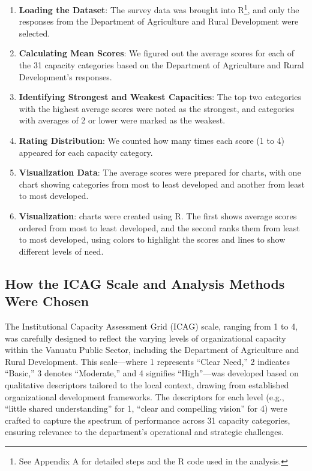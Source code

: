 \documentclass[
  10pt,
]{report}
\providecommand{\tightlist}{%
  \setlength{\itemsep}{0pt}\setlength{\parskip}{0pt}}
\begin{document}
\begin{enumerate}
\def\labelenumi{\arabic{enumi}.}
\tightlist
\item
  \textbf{Loading the Dataset}: The survey data was brought into
  R\footnote{See Appendix A for detailed steps and the R code used in
    the analysis.}, and only the responses from the Department of
  Agriculture and Rural Development were selected.
\item
  \textbf{Calculating Mean Scores}: We figured out the average scores
  for each of the 31 capacity categories based on the Department of
  Agriculture and Rural Development's responses.
\item
  \textbf{Identifying Strongest and Weakest Capacities}: The top two
  categories with the highest average scores were noted as the
  strongest, and categories with averages of 2 or lower were marked as
  the weakest.
\item
  \textbf{Rating Distribution}: We counted how many times each score (1
  to 4) appeared for each capacity category.
\item
  \textbf{Visualization Data}: The average scores were prepared for
  charts, with one chart showing categories from most to least developed
  and another from least to most developed.
\item
  \textbf{Visualization}: charts were created using R. The first shows
  average scores ordered from most to least developed, and the second
  ranks them from least to most developed, using colors to highlight the
  scores and lines to show different levels of need.
\end{enumerate}

\subsection{How the ICAG Scale and Analysis Methods Were
Chosen}\label{how-the-icag-scale-and-analysis-methods-were-chosen}

The Institutional Capacity Assessment Grid (ICAG) scale, ranging from 1
to 4, was carefully designed to reflect the varying levels of
organizational capacity within the Vanuatu Public Sector, including the
Department of Agriculture and Rural Development. This scale---where 1
represents ``Clear Need,'' 2 indicates ``Basic,'' 3 denotes
``Moderate,'' and 4 signifies ``High''---was developed based on
qualitative descriptors tailored to the local context, drawing from
established organizational development frameworks. The descriptors for
each level (e.g., ``little shared understanding'' for 1, ``clear and
compelling vision'' for 4) were crafted to capture the spectrum of
performance across 31 capacity categories, ensuring relevance to the
department's operational and strategic challenges.
\end{document}
